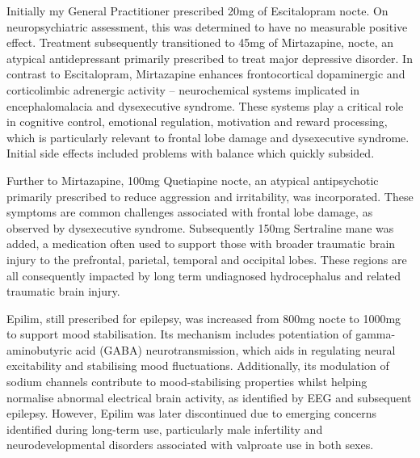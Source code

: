 \documentclass{article}
\begin{document}
Initially my General Practitioner prescribed 20mg of Escitalopram nocte. On neuropsychiatric assessment, this was determined to have no measurable positive effect. Treatment subsequently transitioned to 45mg of Mirtazapine, nocte, an atypical antidepressant primarily prescribed to treat major depressive disorder. In contrast to Escitalopram, Mirtazapine enhances frontocortical dopaminergic and corticolimbic adrenergic activity – neurochemical systems implicated in encephalomalacia and dysexecutive syndrome. These systems play a critical role in cognitive control, emotional regulation, motivation and reward processing, which is particularly relevant to frontal lobe damage and dysexecutive syndrome.\cite{deboer2000} Initial side effects included problems with balance which quickly subsided.

Further to Mirtazapine, 100mg Quetiapine nocte, an atypical antipsychotic primarily prescribed to reduce aggression and irritability, was incorporated. These symptoms are common challenges associated with frontal lobe damage, as observed by dysexecutive syndrome\cite{kim2006}. Subsequently 150mg Sertraline mane was added, a medication often used to support those with broader traumatic brain injury to the prefrontal, parietal, temporal and occipital lobes\cite{ansari2014}. These regions are all consequently impacted by long term undiagnosed hydrocephalus and related traumatic brain injury.

Epilim, still prescribed for epilepsy, was increased from 800mg nocte to 1000mg to support mood stabilisation. Its mechanism includes potentiation of gamma-aminobutyric acid (GABA) neurotransmission, which aids in regulating neural excitability and stabilising mood fluctuations. Additionally, its modulation of sodium channels contribute to mood-stabilising properties whilst helping normalise abnormal electrical brain activity, as identified by EEG and subsequent epilepsy.\cite{loscher2002} However, Epilim was later discontinued due to emerging concerns identified during long-term use, particularly male infertility and neurodevelopmental disorders associated with valproate use in both sexes.\cite{tallon2021,roste2003,veiby2020,christensen2024}
\end{document}
